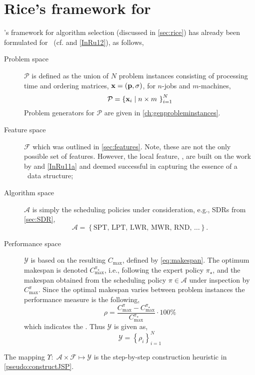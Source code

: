 \section{Rice's framework for \jsp}\label{sec:rice:jsp}
\citeauthor{Rice76}'s framework for algorithm selection (discussed in 
\cref{sec:rice}) has already been formulated for \jsp\ (cf. 
\citet{SmithMilesLion3,SmithMilesLion5} and \cref{InRu12}), as follows, 
\begin{description} 
    \item[Problem space] $\mathcal{P}$ is defined as the union of $N$ problem 
    instances consisting of processing time and ordering matrices, 
    $\mathbf{x}=(\mathbf{p},{\mathbf{\sigma}})$, for $n$-jobs and $m$-machines, 
    \begin{equation} 
    \mathcal{P}=\left\{\mathbf{x}_i\;\middle|\;n\times m~\right\}_{i=1}^{N}
    \end{equation}
    Problem generators for $\mathcal{P}$ are given in 
    \cref{ch:genprobleminstances}.
    \item[Feature space] $\mathcal{F}$ which was outlined in 
    \cref{sec:features}. Note, these are not the only possible set of features. 
    However, the local feature, \phiLocalRelated, are built on the work by 
    \cite{SmithMilesLion3} and \cref{InRu11a} and deemed successful in 
    capturing the essence of a \jsp\ data structure;
    \item[Algorithm space] $\mathcal{A}$ is simply the scheduling policies 
    under consideration, e.g., SDRs from \cref{sec:SDR},
    \begin{equation}
    \mathcal{A}=\left\{\text{SPT,~LPT,~LWR,~MWR,~RND,~}\dotsc\right\}.
    \end{equation} 
    \item[Performance space] $\mathcal{Y}$ is based on the resulting 
    $C_{\max}$, defined by \cref{eq:makespan}. The optimum makespan is denoted 
    $C_{\max}^{\pi_\star}$, i.e., following the expert policy $\pi_\star$, and 
    the makespan obtained from the scheduling policy $\pi\in\mathcal{A}$ under 
    inspection by $C_{\max}^{\pi}$. 
    Since the optimal makespan varies between problem instances the performance 
    measure is the following, 
    \begin{equation}\label{eq:rho}
    \rho=\frac{C_{\max}^{\pi}-C_{\max}^{\pi_\star}}{C_{\max}^{\pi_\star}}\cdot
    100\%
    \end{equation}
    which indicates the \namerho. Thus $\mathcal{Y}$ is given as, 
    \begin{equation}
    \mathcal{Y}=\left\{\rho_i\right\}_{i=1}^{N}
    \end{equation}
\end{description}
The mapping $\Upsilon:\;\mathcal{A}\times\mathcal{F} \mapsto \mathcal{Y}$ is 
the step-by-step construction heuristic in \cref{pseudo:constructJSP}.